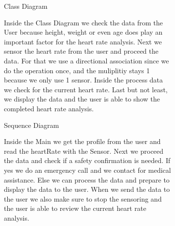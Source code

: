 \documentclass{article}
\begin{document}
	\begin{figure}[htbp]
		\centering
		\begin{subfigure}{\textwidth}
			\resizebox{\textwidth}{!}{}
			\caption{Class Diagram}
		\end{subfigure}
		\begin{subfigure}{\textwidth}
			Inside the Class Diagram we check the data from the User because height, weight or even age does play an important factor
			for the heart rate analysis. Next we sensor the heart rate from the user and proceed the data. For that we use a directional 
			association since we do the operation once, and the muliplitiy stays 1 because we only use 1 sensor. Inside the process data we check for 
			the current heart rate. Last but not least, we display the data and the user is able to show the completed heart rate 
			analysis. 
		\end{subfigure}
	\end{figure}
	\newpage

	\begin{figure}[htbp]
		\centering
		\begin{subfigure}{\textwidth}
			\resizebox{\textwidth}{!}{}
			\caption{Sequence Diagram}
		\end{subfigure}
		\begin{subfigure}{\textwidth}
			Inside the Main we get the profile from the user and read the heartRate with the Sensor. Next we proceed the data and check 
			if a safety confirmation is needed. If yes we do an emergency call and we contact for medical assistance. Else we can process 
			the data and prepare to display the data to the user. When we send the data to the user we also make sure to stop the sensoring and 
			the user is able to review the current heart rate analysis. 
		\end{subfigure}
	\end{figure}
	\newpage
\end{document}
